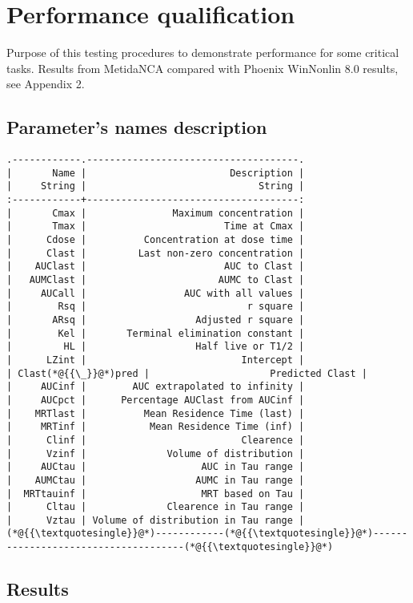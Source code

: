 \documentclass[12pt,a4paper]{article}
\begin{document}
\section{Performance qualification}
Purpose of this testing procedures to demonstrate performance for some critical tasks. Results from MetidaNCA compared with Phoenix WinNonlin 8.0 results, see Appendix 2.

\subsection{Parameter's names description}

\begin{lstlisting}
.------------.-------------------------------------.
|       Name |                         Description |
|     String |                              String |
:------------+-------------------------------------:
|       Cmax |               Maximum concentration |
|       Tmax |                        Time at Cmax |
|      Cdose |          Concentration at dose time |
|      Clast |         Last non-zero concentration |
|    AUClast |                        AUC to Clast |
|   AUMClast |                       AUMC to Clast |
|     AUCall |                 AUC with all values |
|        Rsq |                            r square |
|       ARsq |                   Adjusted r square |
|        Kel |       Terminal elimination constant |
|         HL |                   Half live or T1/2 |
|      LZint |                           Intercept |
| Clast(*@{{\_}}@*)pred |                     Predicted Clast |
|     AUCinf |        AUC extrapolated to infinity |
|     AUCpct |      Percentage AUClast from AUCinf |
|    MRTlast |          Mean Residence Time (last) |
|     MRTinf |           Mean Residence Time (inf) |
|      Clinf |                           Clearence |
|      Vzinf |              Volume of distribution |
|     AUCtau |                    AUC in Tau range |
|    AUMCtau |                   AUMC in Tau range |
|  MRTtauinf |                    MRT based on Tau |
|      Cltau |              Clearence in Tau range |
|      Vztau | Volume of distribution in Tau range |
(*@{{\textquotesingle}}@*)------------(*@{{\textquotesingle}}@*)-------------------------------------(*@{{\textquotesingle}}@*)
\end{lstlisting}


\subsection{Results}
\end{document}
